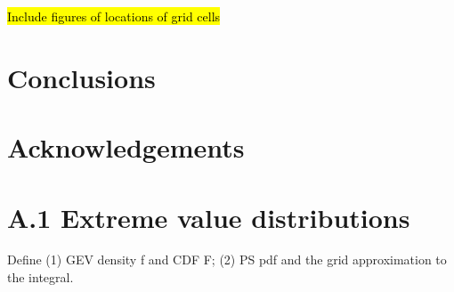 \documentclass[11pt]{article}
\begin{document}
\hl{Include figures of locations of grid cells}

\section{Conclusions}\label{s:con}

\section*{Acknowledgements}

\section*{A.1 Extreme value distributions}
Define (1) GEV density f and CDF F; (2) PS pdf  and the grid approximation to the integral.

\begin{singlespace}


\end{singlespace}
\end{document}
